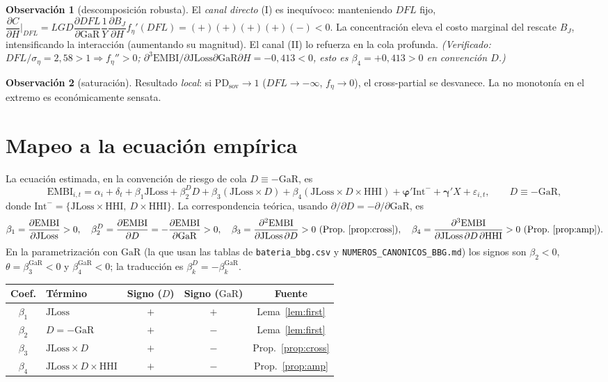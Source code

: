 \documentclass[11pt]{article}
\theoremstyle{plain}
\theoremstyle{definition}
\newtheorem{remark}{Observación}
\newcommand{\JLoss}{\mathrm{JLoss}}
\newcommand{\EMBI}{\mathrm{EMBI}}
\newcommand{\GaR}{\mathrm{GaR}}
\newcommand{\PD}{\mathrm{PD}}
\newcommand{\HHI}{\mathrm{HHI}}
\newcommand{\1}{\mathbf{1}}
\begin{document}
\begin{remark}[descomposición robusta]
El \emph{canal directo} (I) es inequívoco: manteniendo $DFL$ fijo,
$\dfrac{\partial C}{\partial H}\big|_{DFL}=LGD\dfrac{\partial DFL}{\partial\GaR}\dfrac1Y\dfrac{\partial B_J}{\partial H}f_\eta'(DFL)=(+)(+)(+)(+)(-)<0.$
La concentración eleva el costo marginal del rescate $B_J$, intensificando la interacción (aumentando su magnitud). El canal (II) lo refuerza en la cola profunda. \emph{(Verificado: $DFL/\sigma_\eta=2{,}58>1\Rightarrow f_\eta''>0$; $\partial^3\EMBI/\partial\JLoss\partial\GaR\partial H=-0{,}413<0$, esto es $\beta_4=+0{,}413>0$ en convención $D$.)}
\end{remark}

\begin{remark}[saturación]
Resultado \emph{local}: si $\PD_{\text{sov}}\to1$ ($DFL\to-\infty$, $f_\eta\to0$), el cross-partial se desvanece. La no monotonía en el extremo es económicamente sensata.
\end{remark}

\section{Mapeo a la ecuación empírica}\label{sec:map}

La ecuación estimada, en la convención de riesgo de cola $D\equiv-\GaR$, es
\[
\EMBI_{i,t}=\alpha_i+\delta_t+\beta_1\JLoss+\beta_2^{D} D+\beta_3(\JLoss\times D)+\beta_4(\JLoss\times D\times\HHI)+\boldsymbol\varphi'\text{Int}^-+\boldsymbol\gamma'X+\varepsilon_{i,t},\qquad D\equiv-\GaR,
\]
donde $\text{Int}^-=\{\JLoss\times\HHI,\ D\times\HHI\}$. La correspondencia teórica, usando $\partial/\partial D=-\partial/\partial\GaR$, es
\[
\beta_1=\frac{\partial\EMBI}{\partial\JLoss}>0,\quad
\beta_2^{D}=\frac{\partial\EMBI}{\partial D}=-\frac{\partial\EMBI}{\partial\GaR}>0,\quad
\beta_3=\frac{\partial^2\EMBI}{\partial\JLoss\,\partial D}>0\ (\text{Prop.~\ref{prop:cross}}),\quad
\beta_4=\frac{\partial^3\EMBI}{\partial\JLoss\,\partial D\,\partial\HHI}>0\ (\text{Prop.~\ref{prop:amp}}).
\]
En la parametrización con $\GaR$ (la que usan las tablas de \texttt{bateria\_bbg.csv} y \texttt{NUMEROS\_CANONICOS\_BBG.md}) los signos son $\beta_2<0$, $\theta=\beta_3^{\GaR}<0$ y $\beta_4^{\GaR}<0$; la traducción es $\beta_k^{D}=-\beta_k^{\GaR}$.

\begin{center}
\begin{tabular}{clccc}
\toprule
Coef. & Término & Signo ($D$) & Signo ($\GaR$) & Fuente \\
\midrule
$\beta_1$ & $\JLoss$ & $+$ & $+$ & Lema~\ref{lem:first} \\
$\beta_2$ & $D=-\GaR$ & $+$ & $-$ & Lema~\ref{lem:first} \\
$\beta_3$ & $\JLoss\times D$ & $+$ & $-$ & Prop.~\ref{prop:cross} \\
$\beta_4$ & $\JLoss\times D\times\HHI$ & $+$ & $-$ & Prop.~\ref{prop:amp} \\
\bottomrule
\end{tabular}
\end{center}
\end{document}
